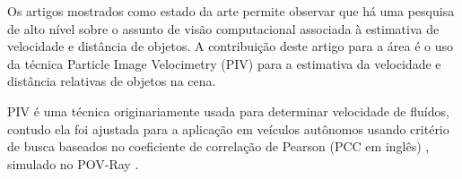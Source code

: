 Os artigos mostrados como estado da arte permite observar que há uma pesquisa de alto nível sobre o assunto de visão computacional associada à
estimativa de velocidade e distância de objetos. A contribuição deste artigo para a área é o uso da técnica Particle Image Velocimetry (PIV) 
para a estimativa da velocidade e distância relativas de objetos na cena.

PIV \cite{Bastiaans} é uma técnica originariamente usada para determinar velocidade de fluídos, contudo ela foi ajustada para a aplicação em
veículos autônomos usando critério de busca baseados no coeficiente de correlação de Pearson (PCC em inglês) \cite{Miranda Neto}, simulado 
no POV-Ray \cite{povray}.


















